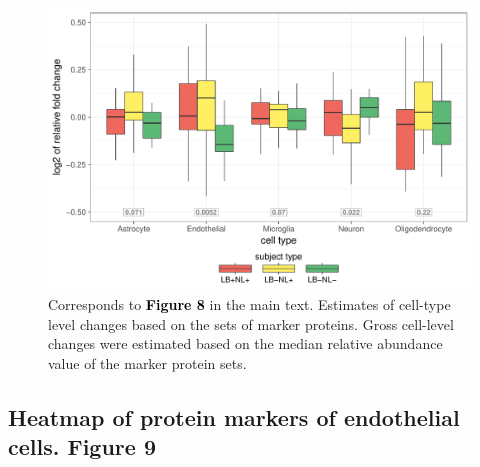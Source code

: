 \documentclass[11pt]{article}\usepackage[]{graphicx}\usepackage[usenames,dvipsnames]{color}
\newenvironment{knitrout}{}{} %
\begin{document}
\begin{figure}[h!]
\center
\begin{minipage}{0.8\textwidth}
\begin{knitrout}
\color{fgcolor}

{\centering \includegraphics[width=1\textwidth]{figure/cell_type_changes-1} 

}



\end{knitrout}
\caption{Corresponds to
\textcolor{black}{\colorbox{highlighter}{\textbf{Figure 8}}} in the main text.
Estimates of cell-type level changes based on the sets of marker proteins.
Gross cell-level changes were estimated based on the median relative abundance
value of the marker protein sets.}
\label{fig:CellTypes}
\end{minipage}
\end{figure}



\clearpage
\subsection{Heatmap of protein markers of endothelial cells. Figure 9}
\end{document}
